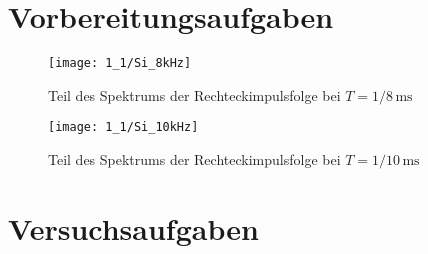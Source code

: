 \documentclass[a4paper, 12pt]{article}
\begin{document}
  
  \clearpage
  \setcounter{page}{1}

\section{Vorbereitungsaufgaben}

\begin{figure}[H]
	\texttt{[image: 1\_1/Si\_8kHz]}
  \caption{Teil des Spektrums der Rechteckimpulsfolge bei $T=1/8\,\si{\milli\second}$}
\end{figure}

\begin{figure}[H]
	\texttt{[image: 1\_1/Si\_10kHz]}
  \caption{Teil des Spektrums der Rechteckimpulsfolge bei $T=1/10\,\si{\milli\second}$}
\end{figure}


\section{Versuchsaufgaben}
\end{document}
